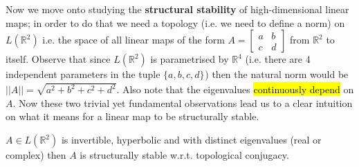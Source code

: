 \documentclass[../main.tex]{subfiles}
\begin{document}
Now we move onto studying the \textbf{structural stability} of high-dimensional linear maps; in order to do that we need a topology (i.e. we need to define a norm) on $L(\mathbb{R}^{2})$ i.e. the space of all linear maps of the form $A = \begin{bmatrix}
        a & b \\
        c & d
\end{bmatrix}$ from $\mathbb{R}^{2}$ to itself.
Observe that since $L(\mathbb{R}^{2})$ is parametrised by $\mathbb{R}^{4}$ (i.e. there are $4$ independent parameters in the tuple $\{a,b,c,d\}_{}$) then the natural norm would be $||A|| = \sqrt{a^{2}+b^{2}+c^{2}+d^{2}}$.
Also note that the eigenvalues \hl{continuously depend} on $A$. Now these two trivial yet fundamental observations lead us to a clear intuition on what it means for a linear map to be structurally stable.
\begin{proposition*}
     $A\in L(\mathbb{R}^{2})$ is invertible, hyperbolic and with distinct eigenvalues (real or complex) then $A$ is structurally stable w.r.t. topological conjugacy.
\end{proposition*}
\end{document}
